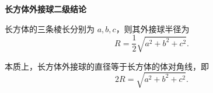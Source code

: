 \textbf{长方体外接球二级结论}

长方体的三条棱长分别为 $a,b,c$，则其外接球半径为
\[
	R=\frac12\sqrt{a^2+b^2+c^2}.
\]

本质上，长方体外接球的直径等于长方体的体对角线，即
\[
	2R=\sqrt{a^2+b^2+c^2}.
\]